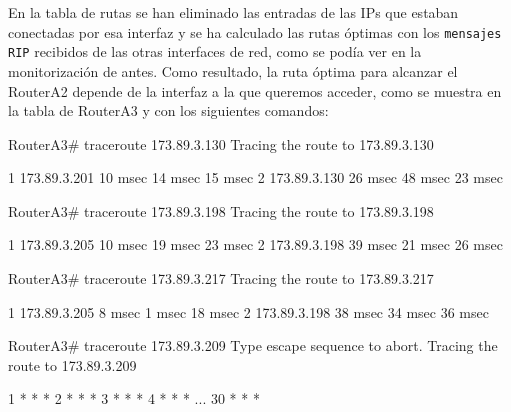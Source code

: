 \par En la tabla de rutas se han eliminado las entradas de las IPs que estaban conectadas por esa interfaz y se ha calculado las rutas óptimas con los \texttt{mensajes RIP} recibidos de las otras interfaces de red, como se podía ver en la monitorización de antes. Como resultado, la ruta óptima para alcanzar el RouterA2 depende de la interfaz a la que queremos acceder, como se muestra en la tabla de RouterA3 y con los siguientes comandos:
\begin{listing}[style=consola]
RouterA3# traceroute 173.89.3.130
Tracing the route to 173.89.3.130

  1   173.89.3.201    10 msec   14 msec   15 msec   
  2   173.89.3.130    26 msec   48 msec   23 msec
  
RouterA3# traceroute 173.89.3.198
Tracing the route to 173.89.3.198

  1   173.89.3.205    10 msec   19 msec   23 msec   
  2   173.89.3.198    39 msec   21 msec   26 msec
  
RouterA3# traceroute 173.89.3.217
Tracing the route to 173.89.3.217

  1   173.89.3.205    8 msec    1 msec    18 msec   
  2   173.89.3.198    38 msec   34 msec   36 msec

RouterA3# traceroute 173.89.3.209
Type escape sequence to abort.
Tracing the route to 173.89.3.209

  1   *     *     *     
  2   *     *     *     
  3   *     *     *     
  4   *     *     *   
  ...  
  30  *     *     *   
\end{listing}







